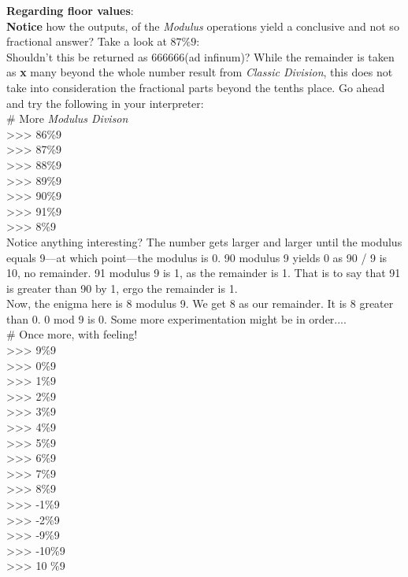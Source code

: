 \documentclass[oneside,12pt]{memoir} %
\begin{document}
\textbf{Regarding floor values}:\\
\textbf{Notice} how the outputs, of the \emph{Modulus} operations yield a conclusive and not so fractional answer? Take a look at \ensuremath{87\%9}:\\
Shouldn't this be returned as 666666(ad infinum)? While the remainder is taken as \textbf{x} many beyond the whole number result from \emph{Classic Division}, this does not take into consideration the fractional parts beyond the tenths place. Go ahead and try the following in your interpreter:\\

\# More \emph{Modulus Divison}\\
{>}{>}{>} 86\%9\\
{>}{>}{>} 87\%9\\
{>}{>}{>} 88\%9\\
{>}{>}{>} 89\%9\\
{>}{>}{>} 90\%9\\
{>}{>}{>} 91\%9\\
{>}{>}{>} 8\%9\\

Notice anything interesting? The number gets larger and larger until the modulus equals 9––at which point––the modulus is 0. 90 modulus 9 yields 0 as 90 / 9 is 10, no remainder. 91 modulus 9 is 1, as the remainder is 1. That is to say that 91 is greater than 90 by 1, ergo the remainder is 1. \\

Now, the enigma here is 8 modulus 9. We get 8 as our remainder. It is 8 greater than 0. 0 mod 9 is 0. Some more experimentation might be in order....\\

\# Once more, with feeling!\\

{>}{>}{>} 9\%9\\
{>}{>}{>} 0\%9\\
{>}{>}{>} 1\%9\\
{>}{>}{>} 2\%9\\
{>}{>}{>} 3\%9\\
{>}{>}{>} 4\%9\\
{>}{>}{>} 5\%9\\
{>}{>}{>} 6\%9\\
{>}{>}{>} 7\%9\\
{>}{>}{>} 8\%9\\
{>}{>}{>} -1\%9\\
{>}{>}{>} -2\%9\\
{>}{>}{>} -9\%9\\
{>}{>}{>} -10\%9\\
{>}{>}{>} 10 \%9\\
\end{document}
